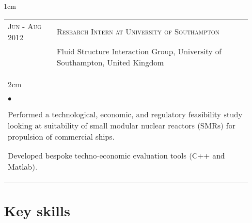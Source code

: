 \documentclass[a4paper,10pt]{article}
\newcommand{\squishlist}{
	\begin{list}{$\bullet$}
	{
		\setlength{\itemsep}{0pt}
		\setlength{\parsep}{0pt}
		\setlength{\topsep}{0pt}
		\setlength{\partopsep}{0pt}
		\setlength{\leftmargin}{2em}
		\setlength{\labelwidth}{1.5em}
		\setlength{\labelsep}{0.5em}
	}
}
\newcommand{\squishend}{\end{list}}
\begin{document}
\begin{minipage}{\textwidth}
\begin{adjustwidth}{}{1cm}
\begin{tabular}{p{3.5cm} p{12.9cm}}
\textsc{Jun - Aug 2012} & \textsc{Research Intern at University of Southampton} \\
						& Fluid Structure Interaction Group, University of Southampton, United Kingdom \vspace{0.1cm} \\
%
\multicolumn{2}{l}{
\hspace{1cm}\begin{minipage}[t]{\textwidth}
\begin{adjustwidth}{}{2cm}
\squishlist
	\item Performed a technological, economic, and regulatory feasibility study looking at suitability of
		small modular nuclear reactors (SMRs) for propulsion of commercial ships.
	\item Developed bespoke techno-economic evaluation tools (C++ and Matlab).
\squishend
\end{adjustwidth}
\end{minipage}
} \\

\end{tabular}

\end{adjustwidth}
\end{minipage}


\section{Key skills}
\end{document}
